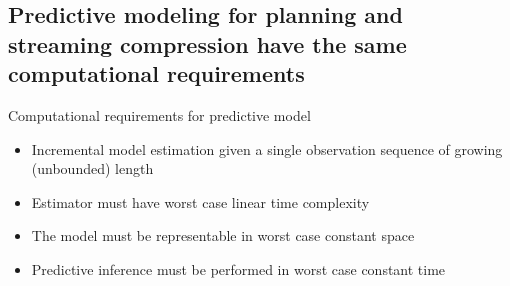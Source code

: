 \documentclass[16pt]{beamer}
\begin{document}
\subsection{Predictive modeling for planning and streaming compression have the same computational requirements}
\begin{frame}[t]{}
Computational requirements for predictive model
\begin{itemize}
\item Incremental model estimation given a single observation sequence of growing (unbounded) length
\item Estimator must have worst case linear time complexity
\item The model must be representable in worst case constant space
\item Predictive inference must be performed in worst case constant time
\end{itemize}


\end{frame}	

\end{document}

